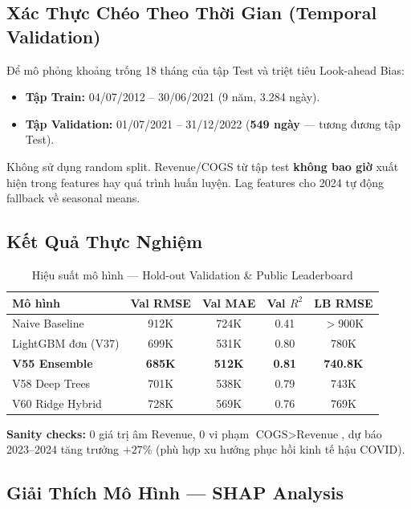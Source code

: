 \documentclass{article}
\begin{document}
\subsection*{Xác Thực Chéo Theo Thời Gian (Temporal Validation)}

Để mô phỏng khoảng trống 18 tháng của tập Test và triệt tiêu Look-ahead Bias:

\begin{itemize}
    \setlength{\itemsep}{1pt}
    \item \textbf{Tập Train:} 04/07/2012 -- 30/06/2021 (9 năm, 3.284 ngày).
    \item \textbf{Tập Validation:} 01/07/2021 -- 31/12/2022 (\textbf{549 ngày} — tương đương tập Test).
\end{itemize}

Không sử dụng random split. Revenue/COGS từ tập test \textbf{không bao giờ} xuất hiện trong features hay quá trình huấn luyện. Lag features cho 2024 tự động fallback về seasonal means.

\subsection*{Kết Quả Thực Nghiệm}

\begin{table}[H]
\centering
\small
\caption{Hiệu suất mô hình — Hold-out Validation \& Public Leaderboard}
\label{tab:metrics}
\begin{tabular}{lcccc}
\toprule
\textbf{Mô hình} & \textbf{Val RMSE} & \textbf{Val MAE} & \textbf{Val $R^2$} & \textbf{LB RMSE} \\
\midrule
Naive Baseline & 912K & 724K & 0.41 & $>$900K \\
LightGBM đơn (V37) & 699K & 531K & 0.80 & 780K \\
\textbf{V55 Ensemble} & \textbf{685K} & \textbf{512K} & \textbf{0.81} & \textbf{740.8K} \\
V58 Deep Trees & 701K & 538K & 0.79 & 743K \\
V60 Ridge Hybrid & 728K & 569K & 0.76 & 769K \\
\bottomrule
\end{tabular}
\end{table}

\textbf{Sanity checks:} 0 giá trị âm Revenue, 0 vi phạm $\text{COGS} > \text{Revenue}$, dự báo 2023--2024 tăng trưởng $+27\%$ (phù hợp xu hướng phục hồi kinh tế hậu COVID).

\subsection*{Giải Thích Mô Hình — SHAP Analysis}
\end{document}
